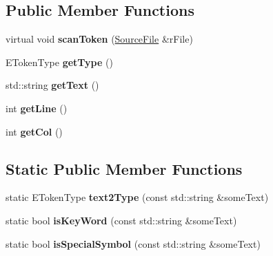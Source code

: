 \subsection*{Public Member Functions}
\begin{DoxyCompactItemize}
\item 
virtual void {\bfseries scan\+Token} (\hyperlink{class_scanner_1_1_source_file}{Source\+File} \&r\+File)\hypertarget{class_scanner_1_1_token_a8a05ceeb54beba7a7212564b4f164446}{}\label{class_scanner_1_1_token_a8a05ceeb54beba7a7212564b4f164446}

\item 
E\+Token\+Type {\bfseries get\+Type} ()\hypertarget{class_scanner_1_1_token_ab1b8fca3f87cdb8d94d689bea15c9ad6}{}\label{class_scanner_1_1_token_ab1b8fca3f87cdb8d94d689bea15c9ad6}

\item 
std\+::string {\bfseries get\+Text} ()\hypertarget{class_scanner_1_1_token_a2154667730517a87309c8ca9e81552e3}{}\label{class_scanner_1_1_token_a2154667730517a87309c8ca9e81552e3}

\item 
int {\bfseries get\+Line} ()\hypertarget{class_scanner_1_1_token_a8da596b64a487ea98244ae269cda90d3}{}\label{class_scanner_1_1_token_a8da596b64a487ea98244ae269cda90d3}

\item 
int {\bfseries get\+Col} ()\hypertarget{class_scanner_1_1_token_a55e7d1b5e89057371ac3924b9cd3708b}{}\label{class_scanner_1_1_token_a55e7d1b5e89057371ac3924b9cd3708b}

\end{DoxyCompactItemize}
\subsection*{Static Public Member Functions}
\begin{DoxyCompactItemize}
\item 
static E\+Token\+Type {\bfseries text2\+Type} (const std\+::string \&some\+Text)\hypertarget{class_scanner_1_1_token_a9d998150939f8ef7fcd0a50f6bece5d8}{}\label{class_scanner_1_1_token_a9d998150939f8ef7fcd0a50f6bece5d8}

\item 
static bool {\bfseries is\+Key\+Word} (const std\+::string \&some\+Text)\hypertarget{class_scanner_1_1_token_a76634cafc7a564d36533376a8ee58f58}{}\label{class_scanner_1_1_token_a76634cafc7a564d36533376a8ee58f58}

\item 
static bool {\bfseries is\+Special\+Symbol} (const std\+::string \&some\+Text)\hypertarget{class_scanner_1_1_token_adc64dc5bb8e26e9b238ac940395826f3}{}\label{class_scanner_1_1_token_adc64dc5bb8e26e9b238ac940395826f3}

\end{DoxyCompactItemize}
